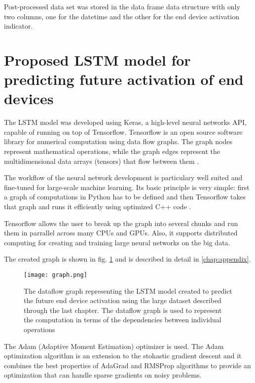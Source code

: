 Post-processed data set was stored in the data frame data structure with only two columns, one for the datetime and the other for the end device activation indicator.

\section{Proposed LSTM model for predicting future activation of end devices}
The LSTM model was developed using Keras, a high-level neural networks API, capable of running on top of Tensorflow.
Tensorflow is an open source software library for numerical computation using data flow graphs.
The graph nodes represent mathematical operations, while the graph edges represent the multidimensional data arrays (tensors) that flow between them \cite{tensorflow}.

The workflow of the neural network development is particulary well suited and fine-tuned for large-scale machine learning.
Its basic principle is very simple: first a graph of computations in Python has to be defined and then Tensorflow takes that graph and runs it efficiently using optimized C++ code \cite{Aurelian}.

Tensorflow allows the user to break up the graph into several chunks and run them in parrallel across many CPUs and GPUs.
Also, it supports distributed computing for creating and training large neural networks on the big data.

The created graph is shown in fig. \ref{fig:graph} and is described in detail in \autoref{chap:appendix}.
\begin{figure}[H]
    \centering
    \texttt{[image: graph.png]}
    \caption{The dataflow graph representing the LSTM model created to predict the future end device activation using the large dataset described through the last chapter.
    The dataflow graph is used to represent the computation in terms of the dependencies between individual operations}
    \label{fig:graph}
\end{figure}
The Adam (Adaptive Moment Estimation) optimizer is used.
The Adam optimization algorithm is an extension to the stohastic gradient descent and it combines the best properties of AdaGrad and RMSProp algorithms to provide an optimization that can handle sparse gradients on noisy problems.


